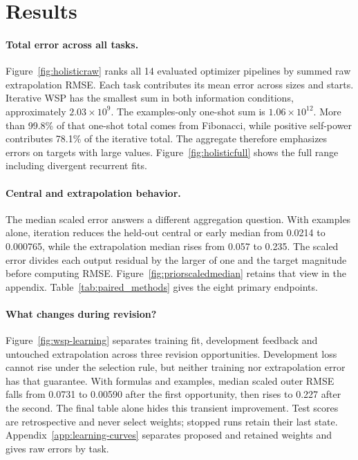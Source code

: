 \section{Results}\label{sec:results}
\paragraph{Total error across all tasks.}
Figure~\ref{fig:holisticraw} ranks all 14 evaluated optimizer pipelines by summed raw extrapolation RMSE. Each task contributes its mean error across sizes and starts. Iterative WSP has the smallest sum in both information conditions, approximately $2.03\times10^9$. The examples-only one-shot sum is $1.06\times10^{12}$. More than 99.8\% of that one-shot total comes from Fibonacci, while positive self-power contributes 78.1\% of the iterative total. The aggregate therefore emphasizes errors on targets with large values. Figure~\ref{fig:holisticfull} shows the full range including divergent recurrent fits.

\paragraph{Central and extrapolation behavior.}
The median scaled error answers a different aggregation question. With examples alone, iteration reduces the held-out central or early median from 0.0214 to 0.000765, while the extrapolation median rises from 0.057 to 0.235. The scaled error divides each output residual by the larger of one and the target magnitude before computing RMSE. Figure~\ref{fig:priorscaledmedian} retains that view in the appendix. Table~\ref{tab:paired_methods} gives the eight primary endpoints.
\paragraph{What changes during revision?}
Figure~\ref{fig:wsp-learning} separates training fit, development feedback and untouched extrapolation across three revision opportunities. Development loss cannot rise under the selection rule, but neither training nor extrapolation error has that guarantee. With formulas and examples, median scaled outer RMSE falls from 0.0731 to 0.00590 after the first opportunity, then rises to 0.227 after the second. The final table alone hides this transient improvement. Test scores are retrospective and never select weights; stopped runs retain their last state. Appendix~\ref{app:learning-curves} separates proposed and retained weights and gives raw errors by task.





